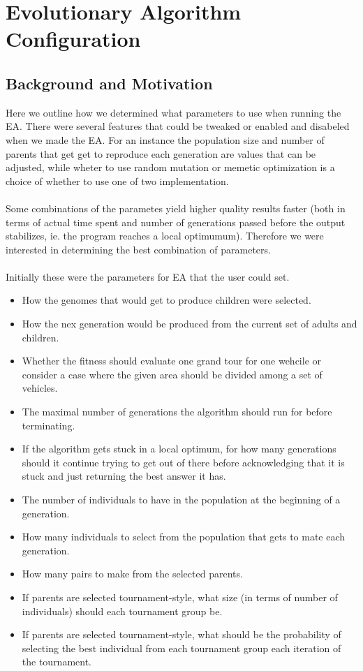 
\chapter{Evolutionary Algorithm Configuration} %
\label{cha:evolutionary_algorithm_configuration}

\section{Background and Motivation} %
\label{sec:background_and_motivation}
Here we outline how we determined what parameters to use when running the EA. There were several features that could be tweaked or enabled and disabeled when we made the EA. For an instance the population size and number of parents that get get to reproduce each generation are values that can be adjusted, while wheter to use random mutation or memetic optimization is a choice of whether to use one of two implementation.
\\\\
Some combinations of the parametes yield higher quality results faster (both in terms of actual time spent and number of generations passed before the output stabilizes, ie. the program reaches a local optimumum). Therefore we were interested in determining the best combination of parameters.
\\\\
Initially these were the parameters for EA that the user could set.
\begin{itemize}
	\item How the genomes that would get to produce children were selected.
	\item How the nex generation would be produced from the current set of adults and children.
	\item Whether the fitness should evaluate one grand tour for one wehcile or consider a case where the given area should be divided among a set of vehicles.
	\item The maximal number of generations the algorithm should run for before terminating.
	\item If the algorithm gets stuck in a local optimum, for how many generations should it continue trying to get out of there before acknowledging that it is stuck and just returning the best answer it has.
	\item The number of individuals to have in the population at the beginning of a generation.
	\item How many individuals to select from the population that gets to mate each generation.
	\item How many pairs to make from the selected parents.
	\item If parents are selected tournament-style, what size (in terms of number of individuals) should each tournament group be.
	\item If parents are selected tournament-style, what should be the probability of selecting the best individual from each tournament group each iteration of the tournament.

\end{itemize}

